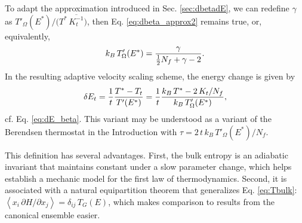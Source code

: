 \documentclass[reprint]{revtex4-1}
\begin{document}
To adapt the approximation introduced in Sec. \ref{sec:dbetadE},
we can redefine $\gamma$ as
$T'_\Omega(E^*) / \bigl( T^* \, \overline{ K_t^{-1} } \bigr)$,
%
%
then Eq. \eqref{eq:dbeta_approx2} remains true,
or, equivalently,
%
\begin{equation}
  k_B \, T'_\Omega(E^*)
  =
  \frac{ \gamma }
  { \frac 1 2 N_f + \gamma - 2 }
  .
  \notag
\end{equation}
%
In the resulting adaptive velocity scaling
scheme, the energy change is given by
%
\begin{equation}
  \delta E_t
  =
  \frac 1 t
  \frac{ T^* - T_t } { T'(E^*) }
  =
  \frac 1 t
  \frac{ k_B \, T^* - 2 \, K_t / N_f }
       { k_B \, T'_\Omega(E^*) }
  ,
  \notag
\end{equation}
cf. Eq. \eqref{eq:dE_beta}.
%
This variant may be understood
as a variant of the Berendsen thermostat
in the Introduction
with
$\tau = 2 \, t \, k_B \, T'_\Omega(E^*) / N_f$.



This definition has several advantages.
%
First, the bulk entropy is an adiabatic invariant\cite{gibbs,
  hertz1910a, *hertz1910b, rugh2001, adib2002, dunkel2014}
  that maintains constant
  under a slow parameter change,
%
which helps establish a mechanic model
for the first law of thermodynamics.
%
Second, it is associated with a natural equipartition theorem\cite{
  khinchin, dunkel2014}
  that generalizes Eq. \eqref{eq:Tbulk}:
$\left\langle x_i \, \partial H/\partial x_j \right\rangle = \delta_{ij} \, T_G(E)$,
which makes comparison to results from the canonical ensemble easier.
\end{document}
